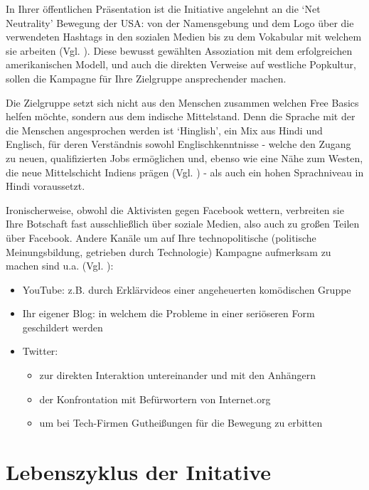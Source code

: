 \documentclass{article}
\begin{document}
In Ihrer öffentlichen Präsentation ist die Initiative angelehnt an die `Net Neutrality' Bewegung der USA: von der Namensgebung und dem Logo über die verwendeten Hashtags in den sozialen Medien bis zu dem Vokabular mit welchem sie arbeiten (Vgl. \cite{prasad2017}).
Diese bewusst gewählten Assoziation mit dem erfolgreichen amerikanischen Modell, und auch die direkten Verweise auf westliche Popkultur, sollen die Kampagne für Ihre Zielgruppe ansprechender machen.

Die Zielgruppe setzt sich nicht aus den Menschen zusammen welchen Free Basics helfen möchte, sondern aus dem indische Mittelstand. Denn die Sprache mit der die Menschen angesprochen werden ist `Hinglish', ein Mix aus Hindi und Englisch, für deren Verständnis sowohl Englischkenntnisse - welche den Zugang zu neuen, qualifizierten Jobs ermöglichen und, ebenso wie eine Nähe zum Westen, die neue Mittelschicht Indiens prägen (Vgl. \cite{fernandes2006}) - als auch ein hohen Sprachniveau in Hindi voraussetzt.

\medskip

Ironischerweise, obwohl die Aktivisten gegen Facebook wettern, verbreiten sie Ihre Botschaft fast ausschließlich über soziale Medien, also auch zu großen Teilen über Facebook. Andere Kanäle um auf Ihre technopolitische (politische Meinungsbildung, getrieben durch Technologie) Kampagne aufmerksam zu machen sind u.a. (Vgl. \cite{prasad2017}):
\begin{itemize}
  \item YouTube: z.B. durch Erklärvideos einer angeheuerten komödischen Gruppe
  \item Ihr eigener Blog: in welchem die Probleme in einer seriöseren Form geschildert werden
  \item Twitter:
    \begin{itemize}
      \item zur direkten Interaktion untereinander und mit den Anhängern
      \item der Konfrontation mit Befürwortern von Internet.org
      \item um bei Tech-Firmen Gutheißungen für die Bewegung zu erbitten
    \end{itemize}
\end{itemize}

\section{Lebenszyklus der Initative}
\end{document}

